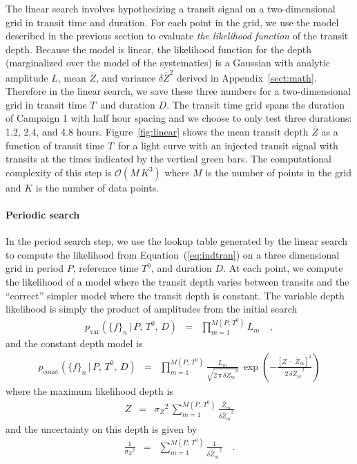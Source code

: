 \documentclass[12pt,preprint]{aastex}
\newcommand{\figref}[1]{\ref{fig:#1}}
\newcommand{\Fig}[1]{Figure~\figref{#1}}
\newcommand{\Eq}[1]{Equation~(\ref{eq:#1})}
\newcommand{\eq}[1]{\Eq{#1}}
\newcommand{\App}[1]{Appendix~\ref{sect:#1}}
\newcommand{\app}[1]{\App{#1}}
\newcommand{\flux}{{\ensuremath{f}}}
\newcommand{\period}{{\ensuremath{P}}}
\newcommand{\phase}{{\ensuremath{T^0}}}
\newcommand{\duration}{{\ensuremath{D}}}
\newcommand{\depth}{{\ensuremath{Z}}}
\newcommand{\transittime}{{\ensuremath{T}}}
\begin{document}
The linear search involves hypothesizing a transit signal on a
two-dimensional grid in transit time and duration.
For each point in the grid, we use the model described in the previous
section to evaluate \emph{the likelihood function} of the transit depth.
Because the model is linear, the likelihood function for the depth
(marginalized over the model of the systematics) is a Gaussian with
analytic amplitude $L$, mean $\bar{\depth}$, and variance
$\delta\bar{\depth}^2$ derived in \app{math}.
Therefore in the linear search, we save these three numbers for a
two-dimensional grid in transit time \transittime\ and duration \duration.
The transit time grid spans the duration of Campaign 1 with half hour spacing
and we choose to only test three durations: 1.2, 2.4, and 4.8 hours.
\Fig{linear} shows the mean transit depth $\bar{\depth}$ as a function of
transit time \transittime\ for a light curve with an injected transit signal
with transits at the times indicated by the vertical green bars.
The computational complexity of this step is $\mathcal{O}(M\,K^3)$ where $M$
is the number of points in the grid and $K$ is the number of data points.


\paragraph{Periodic search}

In the period search step, we use the lookup table generated by the linear
search to compute the likelihood from \eq{indtran} on a three dimensional
grid in period \period, reference time \phase, and duration \duration.
At each point, we compute the likelihood of a model where the transit depth
varies between transits and the ``correct'' simpler model where the transit
depth is constant.
The variable depth likelihood is simply the product of amplitudes from the
initial search
\begin{eqnarray}
p_\mathrm{var}(\{\flux\}_n\,|\,\period,\,\phase,\,\duration) &=&
\prod_{m=1}^{M(\period,\,\phase)} L_m \quad,
\end{eqnarray}
and the constant depth model is
\begin{eqnarray}
p_\mathrm{const}(\{\flux\}_n\,|\,\period,\,\phase,\,\duration) &=&
\prod_{m=1}^{M(\period,\,\phase)}
    \frac{L_m}{\sqrt{2\,\pi\,{\delta\bar{\depth}_m}^2}}\,\exp \left(
        -\frac{[\depth - \bar{\depth}_m]^2}{2\,{\delta\bar{\depth}_m}^2}
    \right)
\end{eqnarray}
where the maximum likelihood depth is
\begin{eqnarray}
\depth &=& {\sigma_\depth}^2\,\sum_{m=1}^{M(\period,\,\phase)}
    \frac{\bar{\depth}_m}{{\delta\bar{\depth}_m}^2}
\end{eqnarray}
and the uncertainty on this depth is given by
\begin{eqnarray}
\frac{1}{{\sigma_\depth}^2} &=& \sum_{m=1}^{M(\period,\,\phase)}
    \frac{1}{{\delta\bar{\depth}_m}^2} \quad.
\end{eqnarray}
\end{document}

